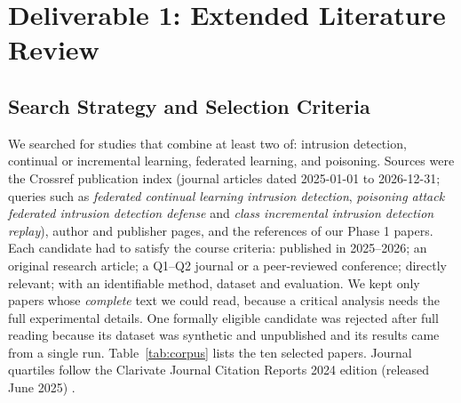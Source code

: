 \documentclass[10pt,a4paper]{article}
\begin{document}
\section{Deliverable 1: Extended Literature Review}

\subsection{Search Strategy and Selection Criteria}
We searched for studies that combine at least two of: intrusion detection, continual or incremental learning, federated learning, and poisoning. Sources were the Crossref publication index (journal articles dated 2025-01-01 to 2026-12-31; queries such as \emph{federated continual learning intrusion detection}, \emph{poisoning attack federated intrusion detection defense} and \emph{class incremental intrusion detection replay}), author and publisher pages, and the references of our Phase 1 papers. Each candidate had to satisfy the course criteria: published in 2025--2026; an original research article; a Q1--Q2 journal or a peer-reviewed conference; directly relevant; with an identifiable method, dataset and evaluation. We kept only papers whose \emph{complete} text we could read, because a critical analysis needs the full experimental details. One formally eligible candidate was rejected after full reading because its dataset was synthetic and unpublished and its results came from a single run. Table~\ref{tab:corpus} lists the ten selected papers. Journal quartiles follow the Clarivate Journal Citation Reports 2024 edition (released June 2025) \cite{clarivate}.
\end{document}
